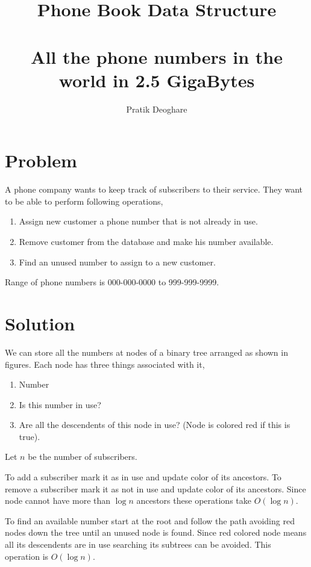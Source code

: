 \documentclass{article}
\title{Phone Book Data Structure
\\
~\\\small{All the phone numbers in the world in 2.5 GigaBytes}}
\author{Pratik Deoghare}
\begin{document}
\maketitle
\tableofcontents

\section{Problem}

A phone company wants to keep track of subscribers to their service. They want
to be able to perform following operations, 

\begin{enumerate}
    \item Assign new customer a phone number that is not already in use.
    \item Remove customer from the database and make his number available. 
    \item Find an unused number to assign to a new customer.
\end{enumerate}

Range of phone numbers is 000-000-0000 to 999-999-9999.

\newpage
\section{Solution}

We can store all the numbers at nodes of a binary tree arranged as shown in
figures. Each node has three things associated with it, 

\begin{enumerate}
    \item Number 
    \item Is this number in use? 
    \item Are all the descendents of this node in use? (Node
        is colored red if this is true).
\end{enumerate}


Let $n$ be the number of subscribers. 

To add a subscriber mark it as in use and update color of its ancestors. 
To remove a subscriber mark it as not in use and update color of its ancestors. 
Since node cannot have more than $\log n$ ancestors these operations take $O(\log n)$.

To find an available number start at the root and follow the path avoiding red
nodes down the tree until an unused node is found. Since red colored node means
all its descendents are in use searching its subtrees can be avoided. This operation
is $O(\log n)$. 
\end{document}
